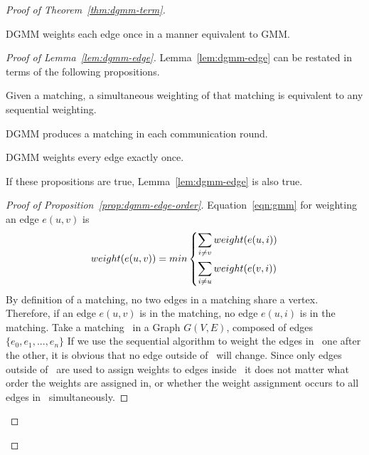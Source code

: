 \begin{proof}[Proof of Theorem~\ref{thm:dgmm-term}]
\label{prf:correct}

\begin{lem}
\label{lem:dgmm-edge}
  DGMM weights each edge once in a manner equivalent to GMM.
\end{lem}
\begin{proof}[Proof of Lemma~\ref{lem:dgmm-edge}]
  Lemma~\ref{lem:dgmm-edge} can be restated in terms of the following propositions.
  \begin{lprp}
    \label{prop:dgmm-edge-order}
    Given a matching, a simultaneous weighting of that matching is equivalent to any sequential weighting.
  \end{lprp}
  \begin{lprp}
    \label{prop:dgmm-edge-match}
    DGMM produces a matching in each communication round.
  \end{lprp}
  \begin{lprp}
    \label{prop:dgmm-edge-once}
    DGMM weights every edge exactly once.
  \end{lprp}
  If these propositions are true, Lemma~\ref{lem:dgmm-edge} is also true. 
  
  \begin{proof}[Proof of Proposition~\ref{prop:dgmm-edge-order}]
    Equation~\ref{eqn:gmm} for weighting an edge $e(u,v)$ is 
    \begin{equation*}
      weight(e(u,v)) = min
      \begin{dcases}
        \sum_{i \ne v} weight(e(u,i))\\
        \sum_{i \ne u} weight(e(v,i))
      \end{dcases}
    \end{equation*}
    By definition of a matching, no two edges in a matching share a vertex. Therefore, if an edge $e(u,v)$ is in the matching, no edge $e(u,i)$ is in the matching. 
    Take a matching \bMd\ in a Graph $G(V,E)$, composed of edges $\{e_0, e_1, ..., e_n\}$ If we use the sequential algorithm to weight the edges in \bMd\ one after the other, it is obvious that no edge outside of \bMd\ will change. Since only edges outside of \bMd\ are used to assign weights to edges inside \bMd\, it does not matter what order the weights are assigned in, or whether the weight assignment occurs to all edges in \bMd\ simultaneously.
    

\end{proof}
\end{proof}
\end{proof}

